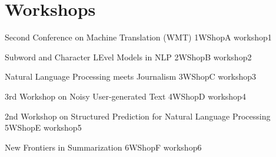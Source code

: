 \chapter[Workshops: \daydate]{Workshops}
\thispagestyle{emptyheader}
\vfill




\clearpage
{}

\begin{wsschedule}
  {Second Conference on Machine Translation (WMT)}
  {1}{WShopA}
  {workshop1}
  {\WShopLocA}
  
\end{wsschedule}
        


\begin{wsschedule}
  {Subword and Character LEvel Models in NLP}
  {2}{WShopB}
  {workshop2}
  {\WShopLocB}
  
\end{wsschedule}

\begin{wsschedule}
  {Natural Language Processing meets Journalism}
  {3}{WShopC}
  {workshop3}
  {\WShopLocC}
  
\end{wsschedule}

\begin{wsschedule}
  {3rd Workshop on Noisy User-generated Text}
  {4}{WShopD}
  {workshop4}
  {\WShopLocD}
  
\end{wsschedule}

\begin{wsschedule}
  {2nd Workshop on Structured Prediction for Natural Language Processing}
  {5}{WShopE}
  {workshop5}
  {\WShopLocE}
  
\end{wsschedule}

\begin{wsschedule}
  {New Frontiers in Summarization}
  {6}{WShopF}
  {workshop6}
  {\WShopLocF}
  
\end{wsschedule}

